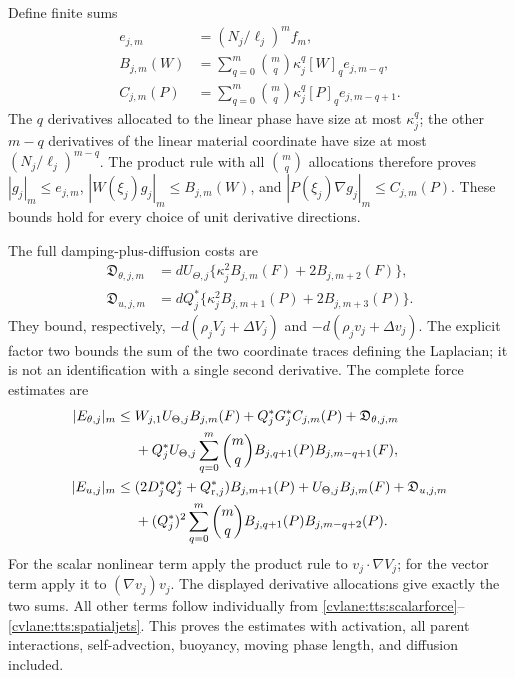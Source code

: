 Define finite sums
\begin{align}\label{cvlane:tts:productbounds}
 e_{j,m}&=(N_j/\ell_j)^mf_m,\nonumber\\
 B_{j,m}(W)&=\sum_{q=0}^m\binom mq
                      \kappa_j^q[W]_qe_{j,m-q},\\
 C_{j,m}(P)&=\sum_{q=0}^m\binom mq
                      \kappa_j^q[P]_qe_{j,m-q+1}.\nonumber
\end{align}
The $q$ derivatives allocated to the linear phase have size at
most $\kappa_j^q$; the other $m-q$ derivatives of the linear
material coordinate have size at most $(N_j/\ell_j)^{m-q}$.
The product rule with all $\binom mq$ allocations therefore proves
$|g_j|_m\leq e_{j,m}$,
$|W(\xi_j)g_j|_m\leq B_{j,m}(W)$, and
$|P(\xi_j)\nabla g_j|_m\leq C_{j,m}(P)$.
These bounds hold for every choice of unit derivative directions.

The full damping-plus-diffusion costs are
\begin{align}\label{cvlane:tts:diffusionnorms}
 \mathfrak D_{\theta,j,m}
 &=dU_{\Theta,j}
       \{\kappa_j^2B_{j,m}(F)+2B_{j,m+2}(F)\},\nonumber\\
 \mathfrak D_{u,j,m}
 &=dQ_j^*
       \{\kappa_j^2B_{j,m+1}(P)+2B_{j,m+3}(P)\}.
\end{align}
They bound, respectively, $-d(\rho_jV_j+\Delta V_j)$ and
$-d(\rho_jv_j+\Delta v_j)$. The explicit factor two bounds
the sum of the two coordinate traces defining the Laplacian;
it is not an identification with a single second derivative.
The complete force estimates are
\begin{align}\label{cvlane:tts:scalarcost}
 |E_{\theta,j}|_m\leq{}&W_{j,1}U_{\Theta,j}B_{j,m}(F)
  +Q_j^*G_j^*C_{j,m}(P)+\mathfrak D_{\theta,j,m}\nonumber\\
 &+Q_j^*U_{\Theta,j}
    \sum_{q=0}^m\binom mq B_{j,q+1}(P)B_{j,m-q+1}(F),\\
 |E_{u,j}|_m\leq{}&(2D_j^*Q_j^*+Q_{{\rm r},j}^*)B_{j,m+1}(P)
   +U_{\Theta,j}B_{j,m}(F)+\mathfrak D_{u,j,m}\nonumber\\
 &+(Q_j^*)^2\sum_{q=0}^m\binom mq
                    B_{j,q+1}(P)B_{j,m-q+2}(P).
 \label{cvlane:tts:vectorcost}
\end{align}
For the scalar nonlinear term apply the product rule to
$v_j\cdot\nabla V_j$; for the vector term apply it to
$(\nabla v_j)v_j$. The displayed derivative allocations give
exactly the two sums. All other terms follow individually from
\eqref{cvlane:tts:scalarforce}--\eqref{cvlane:tts:spatialjets}. This proves
the estimates with activation, all parent interactions, self-advection,
buoyancy, moving phase length, and diffusion included.

